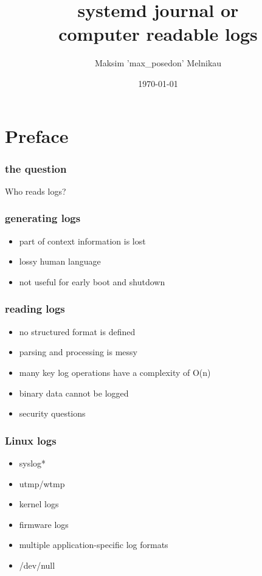 \documentclass{beamer}
\begin{document}
\title{systemd journal or\\computer readable logs}
\author{Maksim 'max\_posedon' Melnikau}
\date{\today}
\frame{\titlepage}

\section{Preface}

\begin{frame}[fragile]
    \frametitle{the question}
    Who reads logs?
\end{frame}

\begin{frame}[fragile]
    \frametitle{generating logs}
    \begin{itemize}
    \item part of context information is lost
    \item lossy human language
    \item not useful for early boot and shutdown
    \end{itemize}
\end{frame}

\begin{frame}[fragile]
    \frametitle{reading logs}
    \begin{itemize}
    \item no structured format is defined
    \item parsing and processing is messy
    \item many key log operations have a complexity of O(n)
    \item binary data cannot be logged
    \item security questions
    \end{itemize}
\end{frame}

\begin{frame}[fragile]
    \frametitle{Linux logs}
    \begin{itemize}
    \item syslog*
    \item utmp/wtmp
    \item kernel logs
    \item firmware logs
    \item multiple application-specific log formats
    \item /dev/null
    \end{itemize}
\end{frame}
\end{document}
